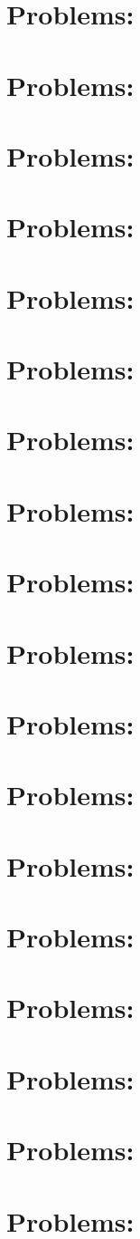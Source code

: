 \documentclass[10pt]{article}
\newcommand{\1}{{\rm 1\hspace*{-0.4ex}%
\rule{0.1ex}{1.52ex}\hspace*{0.2ex}}}
\newcommand{\problemtitle}[1]{\section{Problems: #1}}
\newcommand{\probleminput}[1]{}
\begin{document}
\problemtitle{\matricesTitle}
\probleminput{\matricesPath/problems}

\problemtitle{\propMatricesTitle}
\probleminput{\propMatricesPath/problems}

\problemtitle{\inverseMatTitle}
\probleminput{\inverseMatPath/problems}

\problemtitle{\luDecompTitle}
\probleminput{\luDecompPath/problems}

\problemtitle{\elemMatDetTitle}
\probleminput{\elemMatDetPath/problems}

\problemtitle{\elemMatDetIITitle}
\probleminput{\elemMatDetIIPath/problems}

\problemtitle{\propDetTitle}
\probleminput{\propDetPath/problems}

\problemtitle{\subspacesTitle}
\probleminput{\subspacesPath/problems}

\problemtitle{\linIndepTitle}
\probleminput{\linIndepPath/problems}

\problemtitle{\basisDimTitle}
\probleminput{\basisDimPath/problems}

\problemtitle{\eigenTitle}
\probleminput{\eigenPath/problems}

\problemtitle{\eigenIITitle}
\probleminput{\eigenIIPath/problems}

\problemtitle{\diagTitle}
\probleminput{\diagPath/problems}

\problemtitle{\orthonormTitle}
\probleminput{\orthonormPath/problems}

\problemtitle{\gramSchmidtTitle}
\probleminput{\gramSchmidtPath/problems}

\problemtitle{\diagSymMatTitle}
\probleminput{\diagSymMatPath/problems}

\problemtitle{}
\probleminput{\kernelPath/problems}

\problemtitle{\leastSquaresTitle}
\probleminput{\leastSquaresPath/problems}
\end{document}
